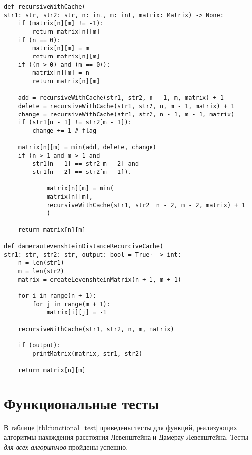 \begin{center}
    \captionsetup{justification=raggedright,singlelinecheck=off}
    \begin{lstlisting}[label=lst:dam_lev_rec_cache,caption=Алгоритм нахождения расстояния Дамерау-Левенштейна (рекурсивный с использованием кеша)]
def recursiveWithCache(
str1: str, str2: str, n: int, m: int, matrix: Matrix) -> None:
	if (matrix[n][m] != -1):
		return matrix[n][m]
	if (n == 0):
		matrix[n][m] = m
		return matrix[n][m]
	if ((n > 0) and (m == 0)):
		matrix[n][m] = n
		return matrix[n][m]
	
	add = recursiveWithCache(str1, str2, n - 1, m, matrix) + 1
	delete = recursiveWithCache(str1, str2, n, m - 1, matrix) + 1
	change = recursiveWithCache(str1, str2, n - 1, m - 1, matrix)
	if (str1[n - 1] != str2[m - 1]):
		change += 1 # flag
	
	matrix[n][m] = min(add, delete, change)
	if (n > 1 and m > 1 and
		str1[n - 1] == str2[m - 2] and
		str1[n - 2] == str2[m - 1]):
	
			matrix[n][m] = min(
			matrix[n][m],
			recursiveWithCache(str1, str2, n - 2, m - 2, matrix) + 1
			)
	
	return matrix[n][m]

def damerauLevenshteinDistanceRecurciveCache(
str1: str, str2: str, output: bool = True) -> int:
	n = len(str1)
	m = len(str2)
	matrix = createLevenshteinMatrix(n + 1, m + 1)
	
	for i in range(n + 1):
		for j in range(m + 1):
			matrix[i][j] = -1
		
	recursiveWithCache(str1, str2, n, m, matrix)
	
	if (output):
		printMatrix(matrix, str1, str2)
	
	return matrix[n][m]

\end{lstlisting}
\end{center}

\section{Функциональные тесты}

В таблице \ref{tbl:functional_test} приведены тесты для функций, реализующих алгоритмы нахождения расстояния Левенштейна и Дамерау-Левенштейна. Тесты \textit{для всех алгоритмов} пройдены успешно.

